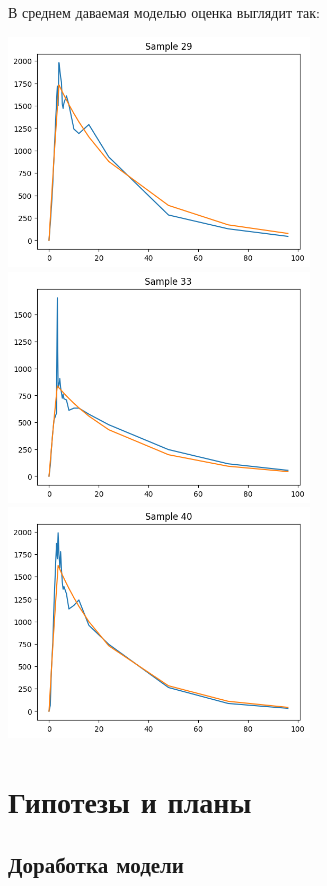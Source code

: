 \documentclass{article}
\begin{document}
В среднем даваемая моделью оценка выглядит так:

\includegraphics[width=0.6\textwidth]{example1_1.png} \newline
\includegraphics[width=0.6\textwidth]{example2_1.png} \newline
\includegraphics[width=0.6\textwidth]{example3_1.png} \newline

\section{Гипотезы и планы}

\subsection{Доработка модели}
\end{document}
